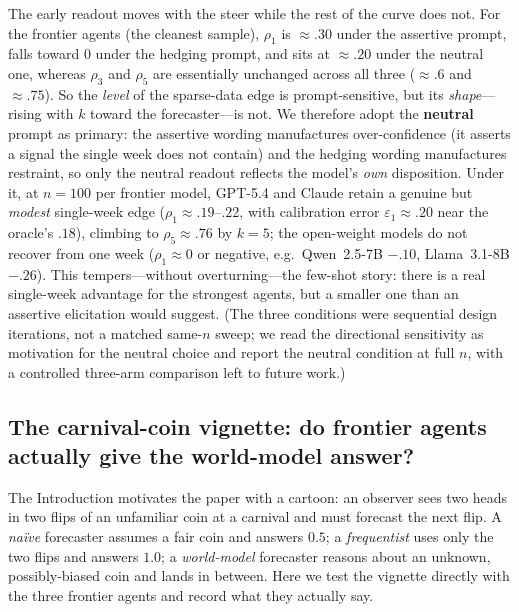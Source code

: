 \documentclass{article} %
\begin{document}
The early readout moves with the steer while the rest of the curve does not. For the frontier agents
(the cleanest sample), $\rho_1$ is ${\approx}.30$ under the assertive prompt, falls toward $0$ under
the hedging prompt, and sits at ${\approx}.20$ under the neutral one, whereas $\rho_3$ and $\rho_5$
are essentially unchanged across all three (${\approx}.6$ and ${\approx}.75$). So the \emph{level} of
the sparse-data edge is prompt-sensitive, but its \emph{shape}---rising with $k$ toward the
forecaster---is not. We therefore adopt the \textbf{neutral} prompt as primary: the assertive wording
manufactures over-confidence (it asserts a signal the single week does not contain) and the hedging
wording manufactures restraint, so only the neutral readout reflects the model's \emph{own}
disposition. Under it, at $n{=}100$ per frontier model, GPT-5.4 and Claude retain a genuine but
\emph{modest} single-week edge ($\rho_1{\approx}.19$--$.22$, with calibration error
$\varepsilon_1{\approx}.20$ near the oracle's $.18$), climbing to $\rho_5{\approx}.76$ by $k{=}5$; the open-weight models do not recover from one week
($\rho_1{\approx}0$ or negative, e.g.\ Qwen~2.5-7B $-.10$, Llama~3.1-8B $-.26$). This
tempers---without overturning---the few-shot story: there is a real single-week advantage for the
strongest agents, but a smaller one than an assertive elicitation would suggest. (The three
conditions were sequential design iterations, not a matched same-$n$ sweep; we read the directional
sensitivity as motivation for the neutral choice and report the neutral condition at full $n$, with a
controlled three-arm comparison left to future work.)

\subsection{The carnival-coin vignette: do frontier agents actually give the world-model answer?}
\label{app:exp2-carnival}

The Introduction motivates the paper with a cartoon: an observer sees two heads in two flips of
an unfamiliar coin at a carnival and must forecast the next flip.  A \emph{na\"ive} forecaster
assumes a fair coin and answers $0.5$; a \emph{frequentist} uses only the two flips and answers
$1.0$; a \emph{world-model} forecaster reasons about an unknown, possibly-biased coin and lands in
between. Here we test the vignette directly with
the three frontier agents and record what they actually say.
\end{document}
